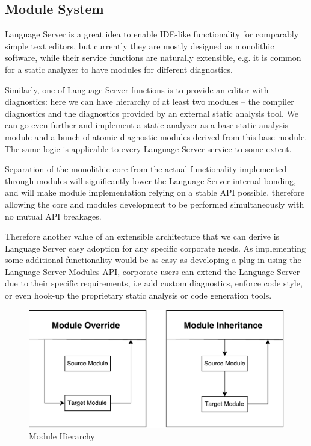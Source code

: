 \subsection{Module System}
\label{sec:met:arch:ms}

Language Server is a great idea to enable IDE-like functionality for
comparably simple text editors, but currently they are mostly designed as 
monolithic software, while their service functions are naturally extensible, 
e.g. it is common for a static analyzer to have modules for different diagnostics.

Similarly, one of Language Server functions is to provide an editor with diagnostics: here we can 
have hierarchy of at least two modules -- the compiler diagnostics and the diagnostics provided by an external static analysis tool.
We can go even further and implement a static analyzer as a base static analysis module and a bunch of atomic diagnostic modules derived 
from this base module. 
The same logic is applicable to every Language Server service to some extent.

Separation of the monolithic core from the actual functionality implemented through modules
will significantly lower the Language Server internal bonding, and will make
module implementation relying on a stable API possible, therefore allowing the core and modules
development to be performed simultaneously with no mutual API breakages.

Therefore another value of an extensible architecture that we can derive is 
Language Server easy adoption for any specific corporate needs. 
As implementing some additional functionality would be as easy as developing a plug-in using 
the Language Server Modules API, corporate users can extend the Language Server 
due to their specific requirements, i.e add custom diagnostics, enforce code style, 
or even hook-up the proprietary static analysis or code generation tools.

\begin{figure}[H]
    \centering
    \includegraphics[width=.7\textwidth]{figs/module_hierarchy.pdf}
    \caption{Module Hierarchy}
\end{figure}

